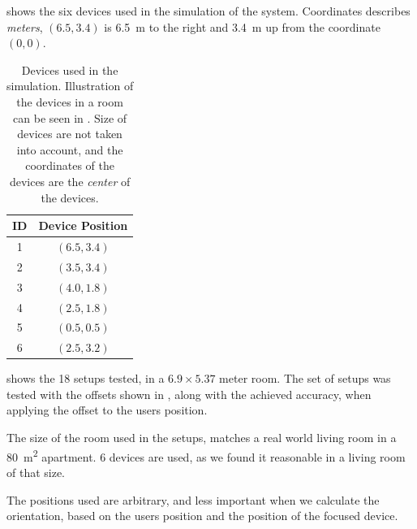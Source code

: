  shows the six devices used in the simulation of the system.
Coordinates describes \emph{meters}, \eg $(6.5, 3.4)$ is \SI{6.5}{\meter} to the right and \SI{3.4}{\meter} up from the coordinate $(0,0)$.

\begin{table}[!hbt]
\centering
\begin{tabular}{c|c}
	ID & Device Position \\ \hline
	1  &  $(6.5, 3.4)$   \\
	2  &  $(3.5 , 3.4)$  \\
	3  &  $(4.0 , 1.8)$  \\
	4  &  $(2.5 , 1.8)$  \\
	5  &  $(0.5 , 0.5)$  \\
	6  &  $(2.5 , 3.2)$
\end{tabular}
\caption{Devices used in the simulation. Illustration of the devices in a room can be seen in . Size of devices are not taken into account, and the coordinates of the devices are the \emph{center} of the devices.}
\label{tbl:evaluation:system-correctness:devices}
\end{table}

 shows the \num{18} setups tested, 
in a $6.9 \times 5.37$ meter room.
The set of setups was tested with the offsets shown in , 
along with the achieved accuracy, 
when applying the offset to the users position.

The size of the room used in the setups, 
matches a real world living room in a \SI{80}{\square\meter} apartment. 
\num{6} devices are used, 
as we found it reasonable in a living room of that size.

The positions used are arbitrary, 
and less important when we calculate the orientation, 
based on the users position and the position of the focused device.

